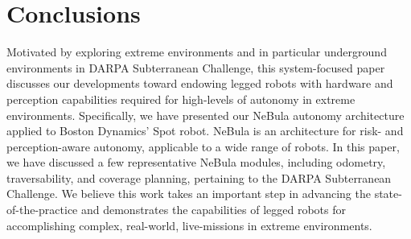 \documentclass[letterpaper, 10pt, conference]{ieeeconf}      %
\begin{document}
\section{Conclusions}\label{sec:conclusions}
Motivated by exploring extreme environments and in particular underground environments in DARPA Subterranean Challenge, this system-focused paper discusses our developments toward endowing legged robots with hardware and perception capabilities required for high-levels of autonomy in extreme environments.
Specifically, we have presented our NeBula autonomy architecture applied to Boston Dynamics' Spot robot. NeBula is an architecture for risk- and perception-aware autonomy, applicable to a wide range of robots. In this paper, we have discussed a few representative NeBula modules, including odometry, traversability, and coverage planning, pertaining to the DARPA Subterranean Challenge. 
We believe this work takes an important step in advancing the state-of-the-practice and demonstrates the capabilities of legged robots for accomplishing complex, real-world, live-missions in extreme environments.



\end{document}
